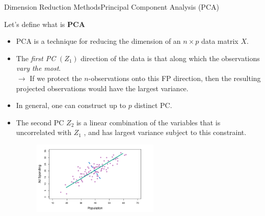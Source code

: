 \begin{frame}{Dimension Reduction Methods}{Principal Component Analysis (PCA)}

Let's define what is \textbf{PCA} \pause 

\begin{itemize}
    \item PCA is a technique for reducing the dimension of an $n \times p$ data matrix $X$. \pause 

    \item The \textit{first PC} $(Z_1)$ direction of the data is that along which the observations \textit{vary the most}. \pause  \\
    $\rightarrow$ If we protect the $n$-observations onto this FP direction, then the resulting projected observations would have the largest variance. \pause 

    \item In general, one can construct up to $p$ distinct PC. \pause 
        
    \item The second PC $Z_2$ is a linear combination of the variables that is uncorrelated with $Z_1$ , and has largest variance subject to this constraint. \pause 

    \begin{figure}
        \centering
        \includegraphics[height=3.5cm]{dim-reduction/pca.png}
    \end{figure} \pause 

\end{itemize}
    
\end{frame}

